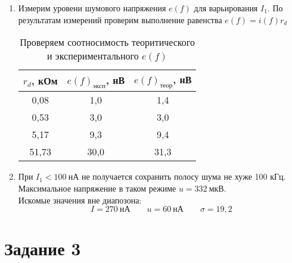 \begin{enumerate}
	\item Измерим уровени шумового напряжения $ e(f) $ для варьирования $ I_1 $. По результатам измерений проверим выполнение равенства $ e(f) = i(f) r_d $
	
	\begin{table}[!h]
		\centering
		\begin{tabular}{|c|c|c|}
			\hline
			$ r_d $, кОм & $ e(f)_{эксп} $, нВ & $ e(f)_{теор} $, нВ \\ \hline
			0,08      & 1,0            & 1,4            \\ \hline
			0,53      & 3,0            & 3,0            \\ \hline
			5,17      & 9,3            & 9,4            \\ \hline
			51,73     & 30,0           & 31,3           \\ \hline
		\end{tabular}
		\caption{Проверяем соотносимость теоритического и экспериментального $ e(f) $}
		\label{tab:table_6}
	\end{table}

	\item При $ I_1 < 100 \ нА $ не получается сохранить полосу шума не хуже 100 кГц. Максимальное напряжение в таком режиме $ u = 332 \ мкВ $. \\
			Искомые значения вне диапозона: 
			\[
				\boxed{I = 270 \ нА} \quad \quad \boxed{u = 60 \ нА} \quad \quad \boxed{\sigma = 19,2}
			\] 
\end{enumerate}

\newpage

\section*{Задание 3}

